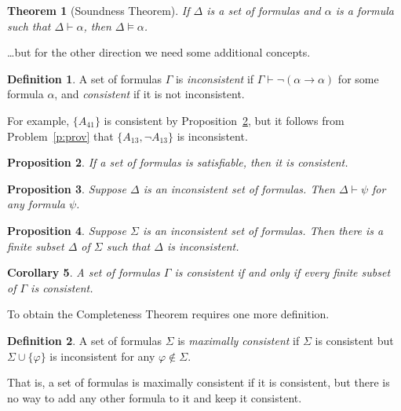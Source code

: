 \documentclass[12pt]{amsbook}
\newcommand{\proves}{\vdash}
\theoremstyle{plain}
\newtheorem{thm}{Theorem}[chapter]
\newtheorem{prop}[thm]{Proposition}
\newtheorem{cor}[thm]{Corollary}
\theoremstyle{definition}
\newtheorem{defn}{Definition}[chapter]
\theoremstyle{remark}
\begin{document}
\begin{thm}[Soundness Theorem] \label{t:psnd}  
If $\Delta$ is a set of formulas and $\alpha$ is a formula such that $\Delta \proves \alpha$,  then $\Delta \models \alpha$.
\end{thm}

\dots but for the other direction we need some additional concepts.

\begin{defn} \label{d:cons}
A set of formulas $\Gamma$ is {\em inconsistent\/} if $\Gamma \proves \lnot(\alpha \to \alpha)$ for some formula $\alpha$,  and {\em consistent\/} if it is not inconsistent.
\end{defn}

For example,   $\{ A_{41} \}$ is consistent by Proposition~\ref{p:stoc},  but it follows from Problem~\ref{p:prov} that $\{ A_{13}, \lnot A_{13} \}$ is inconsistent.

\begin{prop} \label{p:stoc}
If a set of formulas is satisfiable,  then it is consistent.
\end{prop}

\begin{prop} \label{p:inca}
Suppose $\Delta$ is an inconsistent set of formulas.  Then $\Delta \proves \psi$ for any formula $\psi$.
\end{prop}

\begin{prop} \label{p:cmp}
Suppose $\Sigma$ is an inconsistent set of formulas.  Then there is a finite subset $\Delta$ of $\Sigma$ such that $\Delta$ is inconsistent.  
\end{prop}

\begin{cor} \label{c:cmp}
A set of formulas $\Gamma$ is consistent if and only if every finite subset of $\Gamma$ is consistent.
\end{cor}

To obtain the Completeness Theorem requires one more definition.

\begin{defn} \label{d:mxc}  
A set of formulas $\Sigma$ is {\em maximally consistent} if $\Sigma$ is consistent but $\Sigma \cup \{\varphi\}$ is inconsistent for any $\varphi \notin \Sigma$.
\end{defn}

That is,  a set of formulas is maximally consistent if it is consistent,  but there is no way to add any other formula to it and keep it consistent.  
\end{document}
